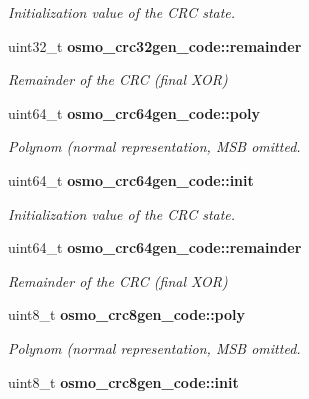\begin{DoxyCompactItemize}
\begin{DoxyCompactList}\small\item\em Initialization value of the CRC state. \item\end{DoxyCompactList}\item 
uint32\_\-t {\bf osmo\_\-crc32gen\_\-code::remainder}\label{group__crcgen_gaa0fc5a5c0a648855bae5d975fc8829c1}

\begin{DoxyCompactList}\small\item\em Remainder of the CRC (final XOR) \item\end{DoxyCompactList}\item 
uint64\_\-t {\bf osmo\_\-crc64gen\_\-code::poly}\label{group__crcgen_gabef85ea259654d573330a1fad0b7f969}

\begin{DoxyCompactList}\small\item\em Polynom (normal representation, MSB omitted. \item\end{DoxyCompactList}\item 
uint64\_\-t {\bf osmo\_\-crc64gen\_\-code::init}\label{group__crcgen_ga73757c2782b9d2e48a64a7d53ea605c3}

\begin{DoxyCompactList}\small\item\em Initialization value of the CRC state. \item\end{DoxyCompactList}\item 
uint64\_\-t {\bf osmo\_\-crc64gen\_\-code::remainder}\label{group__crcgen_ga432d6a569fd5d86bb80a7f6fe9c954e4}

\begin{DoxyCompactList}\small\item\em Remainder of the CRC (final XOR) \item\end{DoxyCompactList}\item 
uint8\_\-t {\bf osmo\_\-crc8gen\_\-code::poly}\label{group__crcgen_ga40cbd268cfea5c97f8380def8fd7baf2}

\begin{DoxyCompactList}\small\item\em Polynom (normal representation, MSB omitted. \item\end{DoxyCompactList}\item 
uint8\_\-t {\bf osmo\_\-crc8gen\_\-code::init}\label{group__crcgen_gade3db78e0cda5fdae402c734d5977f1f}


\end{DoxyCompactItemize}
